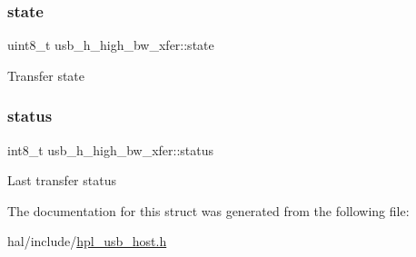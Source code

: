 \subsubsection{\texorpdfstring{state}{state}}
{\footnotesize\ttfamily uint8\+\_\+t usb\+\_\+h\+\_\+high\+\_\+bw\+\_\+xfer\+::state}

Transfer state \mbox{\label{structusb__h__high__bw__xfer_aef5852c090bbad1ecf9acc1fe82f8ca6}} 
\subsubsection{\texorpdfstring{status}{status}}
{\footnotesize\ttfamily int8\+\_\+t usb\+\_\+h\+\_\+high\+\_\+bw\+\_\+xfer\+::status}

Last transfer status 

The documentation for this struct was generated from the following file\+:\begin{DoxyCompactItemize}
\item 
hal/include/\hyperlink{hpl__usb__host_8h}{hpl\+\_\+usb\+\_\+host.\+h}\end{DoxyCompactItemize}
